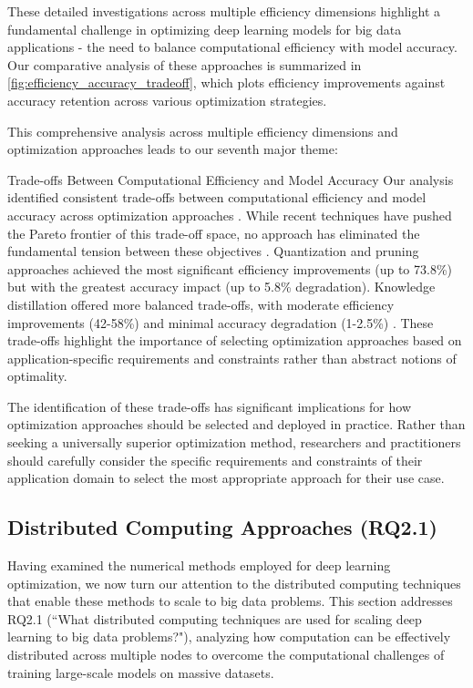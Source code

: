 \documentclass[acmsmall]{acmart}
\begin{document}
These detailed investigations across multiple efficiency dimensions highlight a fundamental challenge in optimizing deep learning models for big data applications - the need to balance computational efficiency with model accuracy. Our comparative analysis of these approaches is summarized in \cref{fig:efficiency_accuracy_tradeoff}, which plots efficiency improvements against accuracy retention across various optimization strategies.

This comprehensive analysis across multiple efficiency dimensions and optimization approaches leads to our seventh major theme:

\begin{themebox}{Trade-offs Between Computational Efficiency and Model Accuracy}
    Our analysis identified consistent trade-offs between computational efficiency and model accuracy across optimization approaches \citep{Wang2021, Kim2022, Lin2022, Park2022}. While recent techniques have pushed the Pareto frontier of this trade-off space, no approach has eliminated the fundamental tension between these objectives \citep{Deb2014}. Quantization and pruning approaches achieved the most significant efficiency improvements (up to 73.8\%) but with the greatest accuracy impact (up to 5.8\% degradation). Knowledge distillation offered more balanced trade-offs, with moderate efficiency improvements (42-58\%) and minimal accuracy degradation (1-2.5\%) \citep{Hinton2015}. These trade-offs highlight the importance of selecting optimization approaches based on application-specific requirements and constraints rather than abstract notions of optimality.
\end{themebox}

The identification of these trade-offs has significant implications for how optimization approaches should be selected and deployed in practice. Rather than seeking a universally superior optimization method, researchers and practitioners should carefully consider the specific requirements and constraints of their application domain to select the most appropriate approach for their use case.

\subsection{Distributed Computing Approaches (RQ2.1)}\label{subsec:distributed-computing-approaches-rq21}
Having examined the numerical methods employed for deep learning optimization, we now turn our attention to the distributed computing techniques that enable these methods to scale to big data problems. This section addresses RQ2.1 (``What distributed computing techniques are used for scaling deep learning to big data problems?"), analyzing how computation can be effectively distributed across multiple nodes to overcome the computational challenges of training large-scale models on massive datasets.
\end{document}
